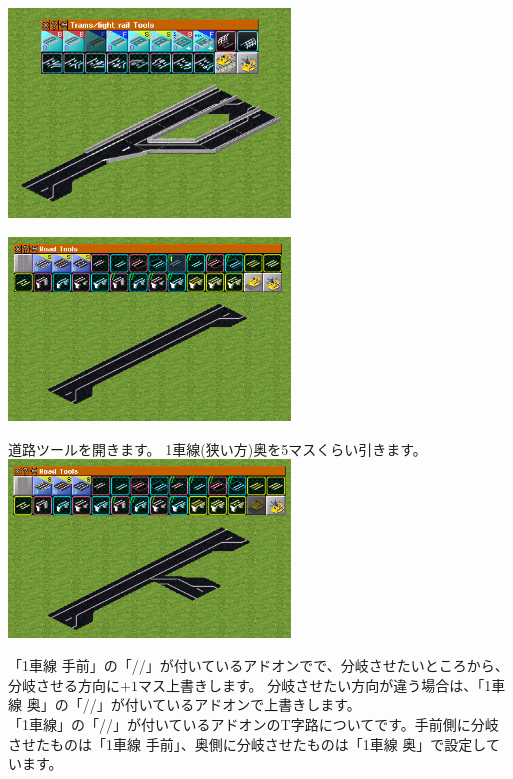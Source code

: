 \documentclass{jbook}
\begin{document}
\includegraphics[width = 75mm]{picture/20210214-road-2-8.png}
\begin{multicols}{2}




\includegraphics[width = 75mm]{picture/20210214-road-2-1.png}

道路ツールを開きます。
1車線(狭い方)奥を5マスくらい引きます。\\

\includegraphics[width = 75mm]{picture/20210214-road-2-2.png}

「1車線 手前」の「//」が付いているアドオンでで、分岐させたいところから、分岐させる方向に$+1$マス上書きします。
分岐させたい方向が違う場合は、「1車線 奥」の「//」が付いているアドオンで上書きします。\\

「1車線」の「//」が付いているアドオンのT字路についてです。手前側に分岐させたものは「1車線 手前」、奥側に分岐させたものは「1車線 奥」で設定しています。\\


\end{multicols}
\end{document}
